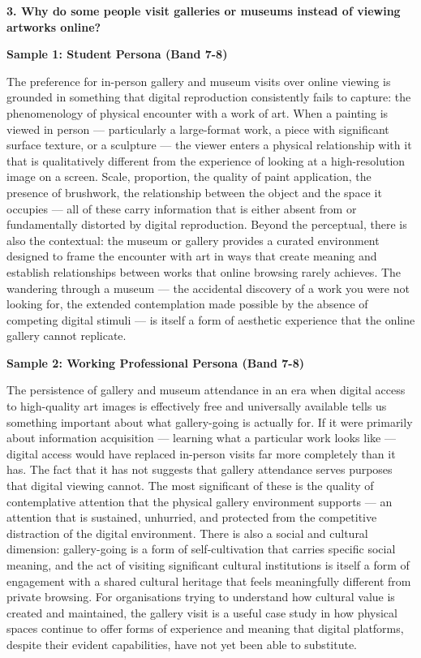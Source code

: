 \separator

\begin{ieltsquestion}
\textbf{3. Why do some people visit galleries or museums instead of viewing artworks online?}
\end{ieltsquestion}
\textbf{Sample 1: Student Persona (Band 7-8)}

The preference for in-person gallery and museum visits over online viewing is grounded in something that digital reproduction consistently fails to capture: the phenomenology of physical encounter with a work of art. When a painting is viewed in person — particularly a large-format work, a piece with significant surface texture, or a sculpture — the viewer enters a physical relationship with it that is qualitatively different from the experience of looking at a high-resolution image on a screen. Scale, proportion, the quality of paint application, the presence of brushwork, the relationship between the object and the space it occupies — all of these carry information that is either absent from or fundamentally distorted by digital reproduction. Beyond the perceptual, there is also the contextual: the museum or gallery provides a curated environment designed to frame the encounter with art in ways that create meaning and establish relationships between works that online browsing rarely achieves. The wandering through a museum — the accidental discovery of a work you were not looking for, the extended contemplation made possible by the absence of competing digital stimuli — is itself a form of aesthetic experience that the online gallery cannot replicate.

\textbf{Sample 2: Working Professional Persona (Band 7-8)}

The persistence of gallery and museum attendance in an era when digital access to high-quality art images is effectively free and universally available tells us something important about what gallery-going is actually for. If it were primarily about information acquisition — learning what a particular work looks like — digital access would have replaced in-person visits far more completely than it has. The fact that it has not suggests that gallery attendance serves purposes that digital viewing cannot. The most significant of these is the quality of contemplative attention that the physical gallery environment supports — an attention that is sustained, unhurried, and protected from the competitive distraction of the digital environment. There is also a social and cultural dimension: gallery-going is a form of self-cultivation that carries specific social meaning, and the act of visiting significant cultural institutions is itself a form of engagement with a shared cultural heritage that feels meaningfully different from private browsing. For organisations trying to understand how cultural value is created and maintained, the gallery visit is a useful case study in how physical spaces continue to offer forms of experience and meaning that digital platforms, despite their evident capabilities, have not yet been able to substitute.

